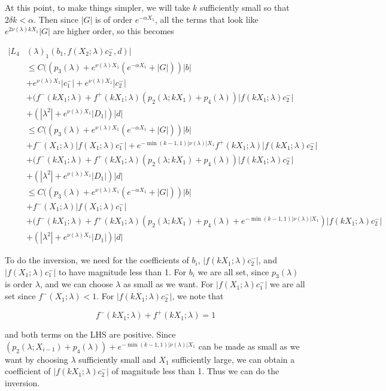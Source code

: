 \documentclass[12pt]{article}
\begin{document}
\begin{enumerate}
At this point, to make things simpler, we will take $k$ sufficiently small so that $2 \delta k < \alpha$. Then since $|G|$ is of order $e^{-\alpha X_1}$, all the terms that look like $e^{2 \nu(\lambda)k X_1}|G|$ are higher order, so this becomes

\begin{align*}
|L_4&(\lambda)_1(b_1, f(X_2; \lambda) c_2^-, d)|\\ 
&\leq C( ( p_3(\lambda) + e^{\nu(\lambda)X_1} (e^{-\alpha X_1} + |G|)) |b| \\
&+ e^{\nu(\lambda)X_1} |c_1^-| + e^{\nu(\lambda)X_1} |c_2^-|\\
&+ (f^-(k X_1; \lambda) + f^+(k X_1; \lambda) (p_2(\lambda; k X_1) + p_4(\lambda)) | f(k X_1; \lambda) c_2^-| \\
&+ (|\lambda^2| + e^{\nu(\lambda)X_1}|D_1|)|d| \\
&\leq C( ( p_3(\lambda) + e^{\nu(\lambda)X_1} (e^{-\alpha X_1} + |G|)) |b| \\
&+ f^-( X_1; \lambda) |f(X_1; \lambda) c_1^-| + e^{- \min(k-1, 1) |\nu(\lambda)|X_1} f^+(k X_1; \lambda) | f(k X_1; \lambda) c_2^-|\\
&+ (f^-(k X_1; \lambda) + f^+(k X_1; \lambda) (p_2(\lambda; k X_1) + p_4(\lambda)) | f(k X_1; \lambda) c_2^-| \\
&+ (|\lambda^2| + e^{\nu(\lambda)X_1}|D_1|)|d|\\
&\leq C( ( p_3(\lambda) + e^{\nu(\lambda)X_1} (e^{-\alpha X_1} + |G|)) |b| \\
&+ f^-( X_1; \lambda) |f(X_1; \lambda) c_1^-| \\
&+ (f^-(k X_1; \lambda) + f^+(k X_1; \lambda) (p_2(\lambda; k X_1) + p_4(\lambda) + e^{- \min(k-1, 1) |\nu(\lambda)|X_1}) | f(k X_1; \lambda) c_2^-| \\
&+ (|\lambda^2| + e^{\nu(\lambda)X_1}|D_1|)|d|
\end{align*}


To do the inversion, we need for the coefficients of $b_i$, $| f(k X_1; \lambda) c_2^-| $, and $| f(X_1; \lambda) c_1^-|$ to have magnitude less than 1. For $b_i$ we are all set, since $p_3(\lambda)$ is order $\lambda$, and we can choose $\lambda$ as small as we want. For $|f(X_1; \lambda) c_1^-|$ we are all set since $f^-(X_1; \lambda) < 1$. For $|f(k X_1; \lambda) c_2^-|$, we note that 

\[
f^-(k X_1; \lambda) + f^+(k X_1; \lambda) = 1
\]

and both terms on the LHS are positive. Since $(p_2(\lambda; X_{i-1}) + p_4(\lambda)) + e^{- \min(k-1, 1) |\nu(\lambda)|X_1}$ can be made as small as we want by choosing $\lambda$ sufficiently small and $X_1$ sufficiently large, we can obtain a coefficient of $| f(k X_1; \lambda) c_2^-|$ of magnitude less than 1. Thus we can do the inversion.\\


\end{enumerate}
\end{document}
